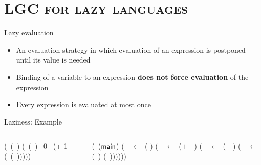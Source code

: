 \documentclass[xcolor=x11names,compress,mathserif]{beamer}
\renewcommand{\(}{\begin{columns}}
\renewcommand{\)}{\end{columns}}
\newcommand{\<}[1]{\begin{column}{#1}}
\renewcommand{\>}{\end{column}}
\begin{document}
\section{\scshape LGC for lazy languages}
\begin{frame} {Lazy evaluation}
\begin{itemize}
\item An evaluation  strategy in which evaluation of  an expression is
  postponed until its value is needed
\item Binding  of a  variable to  an expression  {\bf does  not force
  evaluation} of the expression
\item Every expression is evaluated at most once
\end{itemize}
\end{frame}
\begin{frame} {Laziness:  Example}
\small
\begin{columns}
\begin{column}[T]{.45\textwidth}
  \renewcommand{\arraystretch}{1.1}{
    \begin{uprogram}
      \UFL (\DEFINE\ (\length~\xl)
       (\SIF\  (\NULLQ~\xl)
        \RETURN~0
        \RETURN~(+ 1 (\length~(\CDR~\xl)))))
  \end{uprogram}}
\end{column}
\begin{column}[T]{0.45\textwidth}
\renewcommand{\arraystretch}{1.1}{
  \begin{uprogram}
    \UFL (\DEFINE\ (${\sf main}$)
      (\LET\  \pa\  $\leftarrow$
    (
    ) \IN 
     (\LET\  \pb\  $\leftarrow$ ($+$\ \pa\ \acdr) \IN
       (\LET\ \pc\ $\leftarrow$  (\CONS\ \pb\ \NIL) \IN
         (\LET\ \pw\  $\leftarrow$  (\length\ \pc) \IN
         (\RETURN~\pw))))))
  \end{uprogram}
}
\end{column}
\end{columns}
\end{frame}
\end{document}
